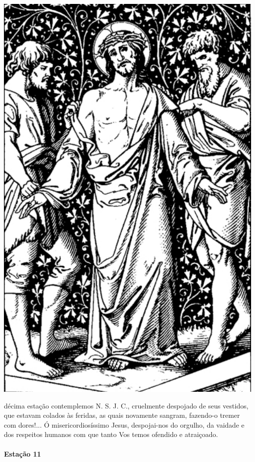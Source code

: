 \begin{nscenter}
\includegraphics[width=.8\textwidth, height=.8\textheight, keepaspectratio]{media/station10}
\end{nscenter}

 décima estação contemplemos N. S. J. C., cruelmente despojado de seus vestidos, que estavam colados às feridas, as quais novamente sangram, fazendo-o tremer com dores!...
Ó misericordiosíssimo Jesus, despojai-nos do orgulho, da vaidade e dos respeitos humanos com que tanto Vos temos ofendido e atraiçoado.

\newpage

\paragraph{Estação 11}

